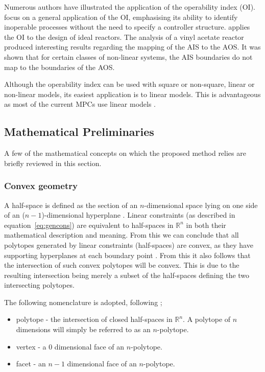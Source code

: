 \documentclass[final,authoryear,5pt,times,twocolumn]{elsarticle}
\newcommand{\npoly}{$n$-polytope}
\begin{document}
Numerous authors have illustrated the application of the operability index (OI). 
\citet{opconproc} focus on a general application of the OI, emphasising its ability to identify inoperable processes without the need to specify a controller structure. 
\citet{opidealrx} applies the OI to the design of ideal reactors. 
The analysis of a vinyl acetate reactor produced interesting results
regarding the mapping of the AIS to the AOS. 
It was shown that for certain classes of non-linear systems, the AIS boundaries do not map to the boundaries of the AOS.

Although the  operability index can be used with square or non-square, linear or non-linear models, its easiest application is to linear models. 
This is advantageous as most of the current MPCs use linear models \citep{vinsonphd}.


\subsection{Mathematical Preliminaries}
A few of the mathematical concepts on which the proposed method relies are briefly reviewed in this section.

\subsubsection{Convex geometry}
A half-space is defined as the section of an $n$-dimensional space lying on one side of an ($n-1$)-dimensional hyperplane \citep[1282]{crcmaths}.
Linear constraints (as described in equation~\ref{eq:gencons}) are equivalent to half-spaces in $\mathbb{R}^n$ in both their mathematical description and meaning.
From this we can conclude that all polytopes generated by linear constraints (half-spaces) are convex, as they have supporting hyperplanes at each boundary point \citep[21]{manilev}.
From this it also follows that the intersection of such convex polytopes will be convex.
This is due to the resulting intersection being merely a subset of the half-spaces defining the two intersecting polytopes.

The following nomenclature is adopted, following \citet[487]{bayerlee};
\begin{itemize}
\item polytope - the intersection of closed half-spaces in $\mathbb{R}^n$.
A polytope of $n$ dimensions will simply be referred to as an $n$-polytope.
\item vertex - a 0 dimensional face of an \npoly.
\item facet - an $n-1$ dimensional face of an \npoly.
\end{itemize}
\end{document}
